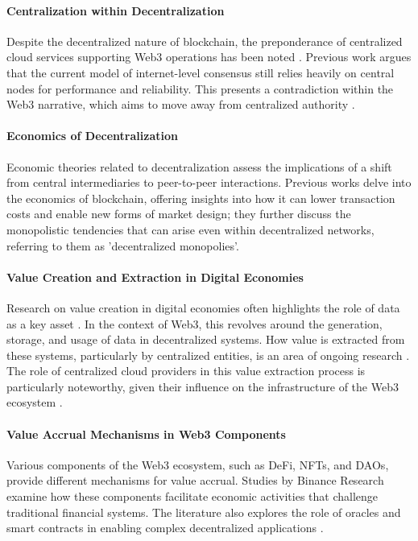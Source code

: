 \documentclass{article}
\begin{document}
\paragraph{Centralization within Decentralization} Despite the decentralized nature of blockchain, the preponderance of centralized cloud services supporting Web3 operations has been noted \cite{swan2015blockchain}. Previous work \cite{mazieres2019stellar} argues that the current model of internet-level consensus still relies heavily on central nodes for performance and reliability. This presents a contradiction within the Web3 narrative, which aims to move away from centralized authority \cite{binanceresearch2021defi}.

\paragraph{Economics of Decentralization} Economic theories related to decentralization assess the implications of a shift from central intermediaries to peer-to-peer interactions. Previous works \cite{catalinigans2020} \cite{weylohmmaxwell2018}  delve into the economics of blockchain, offering insights into how it can lower transaction costs and enable new forms of market design; they further discuss the monopolistic tendencies that can arise even within decentralized networks, referring to them as 'decentralized monopolies'.

\paragraph{Value Creation and Extraction in Digital Economies} Research on value creation in digital economies often highlights the role of data as a key asset \cite{schilling2019technology}. In the context of Web3, this revolves around the generation, storage, and usage of data in decentralized systems. How value is extracted from these systems, particularly by centralized entities, is an area of ongoing research \cite{zohar2015bitcoin}. The role of centralized cloud providers in this value extraction process is particularly noteworthy, given their influence on the infrastructure of the Web3 ecosystem \cite{zheng2018blockchain}.

\paragraph{Value Accrual Mechanisms in Web3 Components} Various components of the Web3 ecosystem, such as DeFi, NFTs, and DAOs, provide different mechanisms for value accrual. Studies by Binance Research \cite{binanceresearch2021defi} examine how these components facilitate economic activities that challenge traditional financial systems. The literature also explores the role of oracles and smart contracts in enabling complex decentralized applications \cite{adler2018astraea}.
\end{document}
